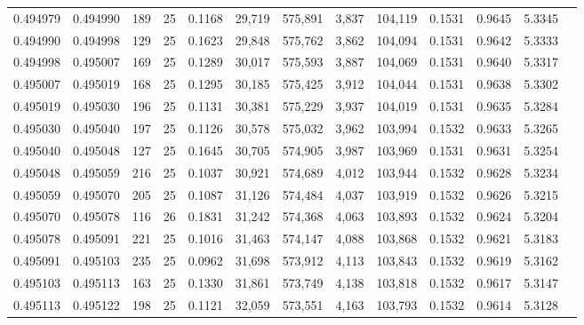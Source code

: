\begin{tabular}{rrrrrrrrrrrrr}
0.494979 & 0.494990 & 189 &  25 &                                     0.1168 &  29,719 & 575,891 &   3,837 & 104,119 & 0.1531 & 0.9645 & 5.3345 \\
0.494990 & 0.494998 & 129 &  25 &                                     0.1623 &  29,848 & 575,762 &   3,862 & 104,094 & 0.1531 & 0.9642 & 5.3333 \\
0.494998 & 0.495007 & 169 &  25 &                                     0.1289 &  30,017 & 575,593 &   3,887 & 104,069 & 0.1531 & 0.9640 & 5.3317 \\
0.495007 & 0.495019 & 168 &  25 &                                     0.1295 &  30,185 & 575,425 &   3,912 & 104,044 & 0.1531 & 0.9638 & 5.3302 \\
0.495019 & 0.495030 & 196 &  25 &                                     0.1131 &  30,381 & 575,229 &   3,937 & 104,019 & 0.1531 & 0.9635 & 5.3284 \\
0.495030 & 0.495040 & 197 &  25 &                                     0.1126 &  30,578 & 575,032 &   3,962 & 103,994 & 0.1532 & 0.9633 & 5.3265 \\
0.495040 & 0.495048 & 127 &  25 &                                     0.1645 &  30,705 & 574,905 &   3,987 & 103,969 & 0.1531 & 0.9631 & 5.3254 \\
0.495048 & 0.495059 & 216 &  25 &                                     0.1037 &  30,921 & 574,689 &   4,012 & 103,944 & 0.1532 & 0.9628 & 5.3234 \\
0.495059 & 0.495070 & 205 &  25 &                                     0.1087 &  31,126 & 574,484 &   4,037 & 103,919 & 0.1532 & 0.9626 & 5.3215 \\
0.495070 & 0.495078 & 116 &  26 &                                     0.1831 &  31,242 & 574,368 &   4,063 & 103,893 & 0.1532 & 0.9624 & 5.3204 \\
0.495078 & 0.495091 & 221 &  25 &                                     0.1016 &  31,463 & 574,147 &   4,088 & 103,868 & 0.1532 & 0.9621 & 5.3183 \\
0.495091 & 0.495103 & 235 &  25 &                                     0.0962 &  31,698 & 573,912 &   4,113 & 103,843 & 0.1532 & 0.9619 & 5.3162 \\
0.495103 & 0.495113 & 163 &  25 &                                     0.1330 &  31,861 & 573,749 &   4,138 & 103,818 & 0.1532 & 0.9617 & 5.3147 \\
0.495113 & 0.495122 & 198 &  25 &                                     0.1121 &  32,059 & 573,551 &   4,163 & 103,793 & 0.1532 & 0.9614 & 5.3128 \\

\end{tabular}
